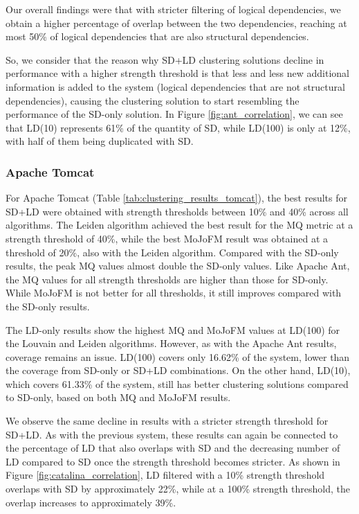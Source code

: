 \documentclass[12pt, a4paper, twoside]{report}
\begin{document}
Our overall findings were that with stricter filtering of logical dependencies, we obtain a higher percentage of overlap between the two dependencies, reaching at most 50\% of logical dependencies that are also structural dependencies.

So, we consider that the reason why SD+LD clustering solutions decline in performance with a higher strength threshold is that less and less new additional information is added to the system (logical dependencies that are not structural dependencies), causing the clustering solution to start resembling the performance of the SD-only solution. In Figure \ref{fig:ant_correlation}, we can see that LD(10) represents 61\% of the quantity of SD, while LD(100) is only at 12\%, with half of them being duplicated with SD.

\subsubsection{Apache Tomcat}

For Apache Tomcat (Table \ref{tab:clustering_results_tomcat}), the best results for SD+LD were obtained with strength thresholds between 10\% and 40\% across all algorithms. The Leiden algorithm achieved the best result for the MQ metric at a strength threshold of 40\%, while the best MoJoFM result was obtained at a threshold of 20\%, also with the Leiden algorithm. Compared with the SD-only results, the peak MQ values almost double the SD-only values. Like Apache Ant, the MQ values for all strength thresholds are higher than those for SD-only. While MoJoFM is not better for all thresholds, it still improves compared with the SD-only results.

The LD-only results show the highest MQ and MoJoFM values at LD(100) for the Louvain and Leiden algorithms. However, as with the Apache Ant results, coverage remains an issue. LD(100) covers only 16.62\% of the system, lower than the coverage from SD-only or SD+LD combinations. On the other hand, LD(10), which covers 61.33\% of the system, still has better clustering solutions compared to SD-only, based on both MQ and MoJoFM results.

We observe the same decline in results with a stricter strength threshold for SD+LD. As with the previous system, these results can again be connected to the percentage of LD that also overlaps with SD and the decreasing number of LD compared to SD once the strength threshold becomes stricter. As shown in Figure \ref{fig:catalina_correlation}, LD filtered with a 10\% strength threshold overlaps with SD by approximately 22\%, while at a 100\% strength threshold, the overlap increases to approximately 39\%.
\end{document}
